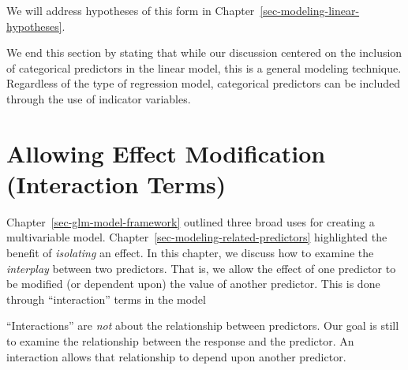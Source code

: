 \documentclass[
  letterpaper,
  DIV=11,
  numbers=noendperiod]{scrreprt}
\theoremstyle{definition}
\theoremstyle{definition}
\theoremstyle{remark}
\begin{document}
We will address hypotheses of this form in
Chapter~\ref{sec-modeling-linear-hypotheses}.

We end this section by stating that while our discussion centered on the
inclusion of categorical predictors in the linear model, this is a
general modeling technique. Regardless of the type of regression model,
categorical predictors can be included through the use of indicator
variables.

\hypertarget{sec-modeling-interactions}{%
\chapter{Allowing Effect Modification (Interaction
Terms)}\label{sec-modeling-interactions}}

\providecommand{\norm}[1]{\lVert#1\rVert}
\providecommand{\abs}[1]{\lvert#1\rvert}
\providecommand{\dist}[1]{\stackrel{\text{#1}}{\sim}}
\providecommand{\ind}[1]{\mathbb{I}\left(#1\right)}
\providecommand{\bm}[1]{\mathbf{#1}}
\providecommand{\bs}[1]{\boldsymbol{#1}}
\providecommand{\Ell}{\mathcal{L}}
\providecommand{\indep}{\perp\negthickspace\negmedspace\perp}

Chapter~\ref{sec-glm-model-framework} outlined three broad uses for
creating a multivariable model.
Chapter~\ref{sec-modeling-related-predictors} highlighted the benefit of
\emph{isolating} an effect. In this chapter, we discuss how to examine
the \emph{interplay} between two predictors. That is, we allow the
effect of one predictor to be modified (or dependent upon) the value of
another predictor. This is done through ``interaction'' terms in the
model

\begin{tcolorbox}[enhanced jigsaw, bottomrule=.15mm, titlerule=0mm, bottomtitle=1mm, colback=white, coltitle=black, rightrule=.15mm, leftrule=.75mm, toprule=.15mm, toptitle=1mm, left=2mm, opacityback=0, colframe=quarto-callout-warning-color-frame, breakable, title=\textcolor{quarto-callout-warning-color}{\faExclamationTriangle}\hspace{0.5em}{Warning}, arc=.35mm, colbacktitle=quarto-callout-warning-color!10!white, opacitybacktitle=0.6]

``Interactions'' are \emph{not} about the relationship between
predictors. Our goal is still to examine the relationship between the
response and the predictor. An interaction allows that relationship to
depend upon another predictor.

\end{tcolorbox}
\end{document}
